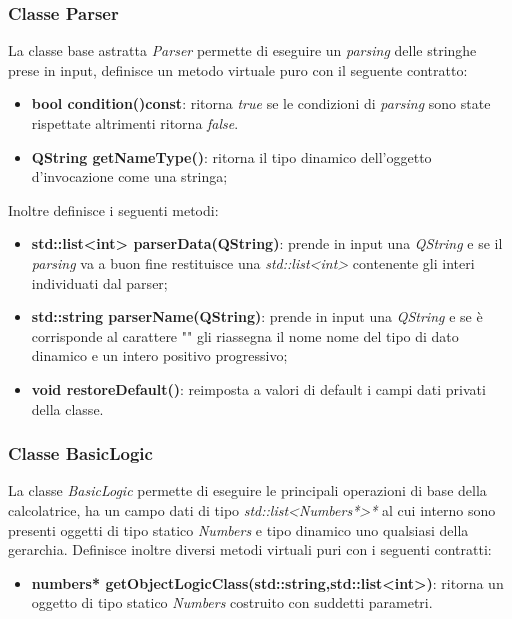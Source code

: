 \documentclass[a4paper,10pt]{article}
\begin{document}
        \subsubsection{Classe Parser}
        La classe base astratta \textit{Parser} permette di eseguire un \textit{parsing} delle stringhe prese in input, definisce un metodo virtuale puro con il seguente contratto:
        \begin{itemize}
            \item \textbf{bool condition()const}: ritorna \textit{true} se le condizioni di \textit{parsing} sono state rispettate altrimenti ritorna \textit{false}.
            \item \textbf{QString getNameType()}: ritorna il tipo dinamico dell'oggetto d'invocazione come una stringa;
        \end{itemize}
        Inoltre definisce i seguenti metodi:
        \begin{itemize}
            \item \textbf{std::list<int> parserData(QString)}: prende in input una \textit{QString} e se il \textit{parsing} va a buon fine restituisce una \textit{std::list<int>} contenente gli interi individuati dal parser;
            \item \textbf{std::string parserName(QString)}: prende in input una \textit{QString} e se è corrisponde al carattere "" gli riassegna il nome nome del tipo di dato dinamico e un intero positivo progressivo;
            \item \textbf{void restoreDefault()}: reimposta a valori di default i campi dati privati della classe.
        \end{itemize}
        
        \subsubsection{Classe BasicLogic}
        La classe \textit{BasicLogic} permette di eseguire le principali operazioni di base della calcolatrice, ha un campo dati di tipo \textit{std::list<Numbers*>*} al cui interno sono presenti oggetti di tipo statico \textit{Numbers} e tipo dinamico uno qualsiasi della gerarchia.
        Definisce inoltre diversi metodi virtuali puri con i seguenti contratti:
        \begin{itemize}
            \item \textbf{numbers* getObjectLogicClass(std::string,std::list<int>)}: ritorna un oggetto di tipo statico \textit{Numbers} costruito con suddetti parametri.
        \end{itemize}
\end{document}
